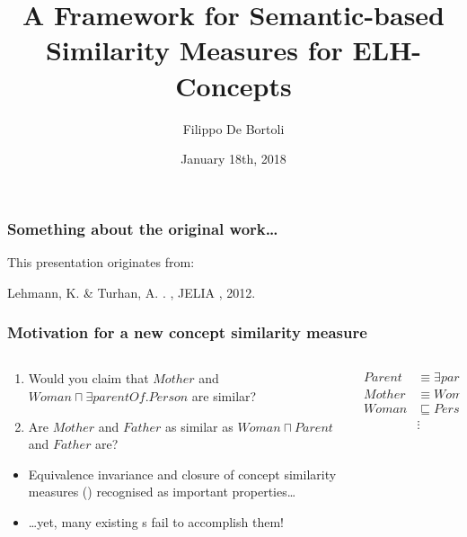 \documentclass{beamer}
\title{A Framework for Semantic-based Similarity Measures for ELH-Concepts}
\author{Filippo De Bortoli}
\institute{European Master's Program in Computational Logic, TU Dresden}
\date{January 18th, 2018}
\begin{document}
\maketitle

\begin{frame}
  \frametitle{Something about the original work\ldots}
  This presentation originates from:
  \begin{thebibliography}
    \bibitem{}
     Lehmann, K. \& Turhan, A.
	   .
	   , {JELIA} , 2012.
  \end{thebibliography}
\end{frame}

\begin{frame}
  \frametitle{Motivation for a new concept similarity measure}
  
  \begin{columns}
    \begin{column}{0.61\textwidth}
      \begin{enumerate}[<+->]
        \item Would you claim that \(Mother\) and
        \(Woman \sqcap \exists{}parentOf.Person\) are similar?
        \item Are \(Mother\) and \(Father\) as similar
        as \(Woman \sqcap Parent\) and \(Father\) are?
      \end{enumerate}
      \begin{itemize}[<+->]
        \item Equivalence \alert{invariance} and \alert{closure}
        of concept similarity measures (\csm)
        recognised as important properties\ldots
        \item \ldots yet, many existing
        \csm{}s fail to accomplish them!
      \end{itemize}
    \end{column}
    \begin{column}{0.39\textwidth}
      \begin{align*}
        Parent &\equiv \exists{}parentOf.Person \\
        Mother &\equiv Woman \sqcap Parent \\
        Woman &\sqsubseteq Person \\
        &\vdots         
      \end{align*}
    \end{column}
  \end{columns}
\end{frame}
\end{document}
